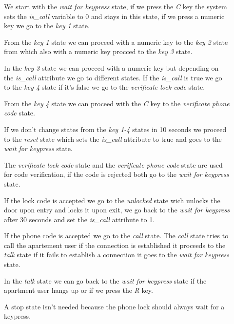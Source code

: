\documentclass[11pt,a4paper]{article}
\begin{document}
\begin{description}
    \item[]
    We start with the \emph{wait for keypress} state, if we press the \emph{C} key the system
    sets the \emph{is\_call} variable to 0 and stays in this state, 
    if we press a numeric key we go to the \emph{key 1} state.
    \item[]
    From the \emph{key 1} state we can proceed with a numeric key
    to the \emph{key 2} state from which also with a 
    numeric key procced to the \emph{key 3} state.
    \item[]
    In the \emph{key 3} state we can proceed with a numeric key but depending on the
    \emph{is\_call} attribute we go to different states. If the \emph{is\_call} is true
    we go to the \emph{key 4} state if it's false we go to the \emph{verificate lock code}
    state.
    \item[]
    From the \emph{key 4} state we can proceed with the \emph{C} key 
    to the \emph{verificate phone code} state.
    \item[]
    If we don't change states from the \emph{key 1-4} states in 10 seconds 
    we proceed to the \emph{reset} state which sets the \emph{is\_call} attribute
    to true and goes to the \emph{wait for keypress} state.
    \item[]
    The \emph{verificate lock code} state and the \emph{verificate phone code} state
    are used for code verification, if the code is rejected both go to the 
    \emph{wait for keypress} state.
    \item[]
    If the lock code is accepted we go to the \emph{unlocked} state wich unlocks the
    door upon entry and locks it upon exit, we go back to the \emph{wait for keypress}
    after 30 seconds and set the \emph{is\_call} attribute to 1.
    \item[]
    If the phone code is accepted we go to the \emph{call} state. The \emph{call} state
    tries to call the apartement user if the connection is established it proceeds to the
    \emph{talk} state if it fails to establish a connection it goes to the 
    \emph{wait for keypress} state.
    \item[]
    In the \emph{talk} state we can go back to the \emph{wait for keypress} state
    if the apartment user hangs up or if we press the \emph{R} key.
    \item[]
    A stop state isn't needed because the phone lock should always wait for a keypress.
\end{description}
\end{document}
